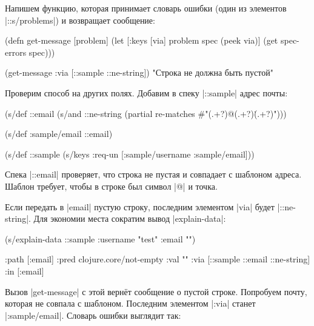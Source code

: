 Напишем функцию, которая принимает словарь ошибки (один из элементов
\spverb|::s/problems|) и возвращает сообщение:


  \begin{clojure}
(defn get-message [problem]
  (let [{:keys [via]} problem
        spec (peek via)]
    (get spec-errors spec)))

(get-message {:via [::sample ::ne-string]})
"Строка не должна быть пустой"
  \end{clojure}

Проверим способ на других полях. Добавим в спеку \spverb|::sample| адрес почты:


\begin{english}
  \begin{clojure}
(s/def ::email
  (s/and
   ::ne-string
   (partial re-matches #"(.+?)@(.+?)\.(.+?)")))

(s/def :sample/email ::email)

(s/def ::sample
  (s/keys :req-un [:sample/username
                   :sample/email]))
  \end{clojure}
\end{english}

Спека \spverb|::email| проверяет, что строка не пустая и совпадает с шаблоном
адреса. Шаблон требует, чтобы в строке был символ \spverb|@| и точка.

Если передать в \spverb|email| пустую строку, последним элементом \spverb|via|
будет \spverb|::ne-string|. Для экономии места сократим вывод
\spverb|explain-data|:

\begin{english}
  \begin{clojure}
(s/explain-data ::sample {:username "test" :email ""})

{:path [:email]
 :pred clojure.core/not-empty
 :val ""
 :via [::sample ::email ::ne-string]
 :in [:email]}
  \end{clojure}
\end{english}

Вызов \spverb|get-message| с этой верн\"{е}т сообщение о пустой строке. Попробуем
почту, которая не совпала с шаблоном. Последним элементом \spverb|:via| станет
\spverb|:sample/email|. Словарь ошибки выглядит так:

